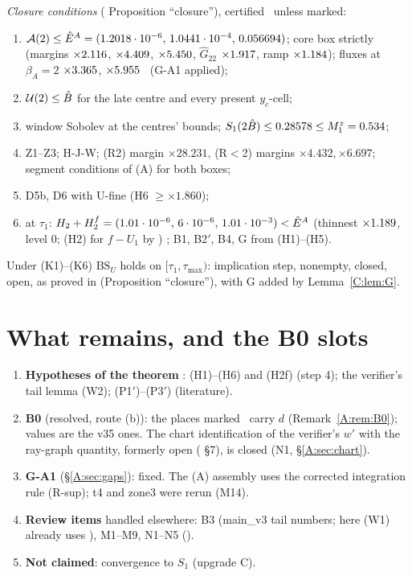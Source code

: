 \documentclass[11pt]{article}
\begin{document}
\noindent\emph{Closure conditions} ( Proposition ``closure''), certified \tC\ unless marked:
\begin{enumerate}[label=(K\arabic*),leftmargin=2.6em]
\item $\mathcal A(2)\le\hat E^A=(1.2018\cdot10^{-6},\,1.0441\cdot10^{-4},\,0.056694)$; core box strictly (margins $\times2.116$, $\times4.409$, $\times5.450$, $\hat G_{22}$ $\times1.917$, ramp $\times1.184$); fluxes at $\beta_A=2$ $\times3.365$, $\times5.955$ \tB\ (G-A1 applied);
\item $\mathcal U(2)\le\hat B$ for the late centre and every present $y_c$-cell;
\item window Sobolev at the centres' bounds; $S_1(2\hat B)\le0.28578\le M_1^z=0.534$;
\item Z1--Z3; H-J-W; (R2) margin $\times28.231$, (R$<$2) margins $\times4.432,\times6.697$; segment conditions of (A) for both boxes;
\item D5b, D6 with U-fine (H6 $\ge\times1.860$);
\item at $\tau_1$: $H_2+H^f_2=(1.01\cdot10^{-6},\,6\cdot10^{-6},\,1.01\cdot10^{-3})<\hat E^A$ (thinnest $\times1.189$, level 0; (H2) for $f-U_1$ by ) \tB; B1, B2$'$, B4, G from (H1)--(H5).
\end{enumerate}
Under (K1)--(K6) $\mathrm{BS}_U$ holds on $[\tau_1,\tau_{\max})$: implication step, nonempty, closed, open, as proved in  (Proposition ``closure''), with G added by Lemma~\ref{C:lem:G}.



\section{What remains, and the B0 slots}\label{M:sec:remains}
\begin{enumerate}[leftmargin=*]
\item \textbf{Hypotheses of the theorem} \tH: (H1)--(H6) and (H2f) (step 4); the verifier's tail lemma (W2); (P1$'$)--(P3$'$) (literature).
\item \textbf{B0} (resolved, route (b)): the places marked \tB\ carry $d$ (Remark~\ref{A:rem:B0}); values are the v35 ones. The chart identification of the verifier's $w'$ with the ray-graph quantity, formerly open ( \S7), is closed (N1, \S\ref{A:sec:chart}).
\item \textbf{G-A1} (\S\ref{A:sec:gaps}): fixed. The (A) assembly uses the corrected integration rule (R-sup); t4 and zone3 were rerun (M14).
\item \textbf{Review items} handled elsewhere: B3 (main\_v3 tail numbers; here (W1) already uses ), M1--M9, N1--N5 ().
\item \textbf{Not claimed}: convergence to $S_1$ (upgrade C).
\end{enumerate}
\end{document}
